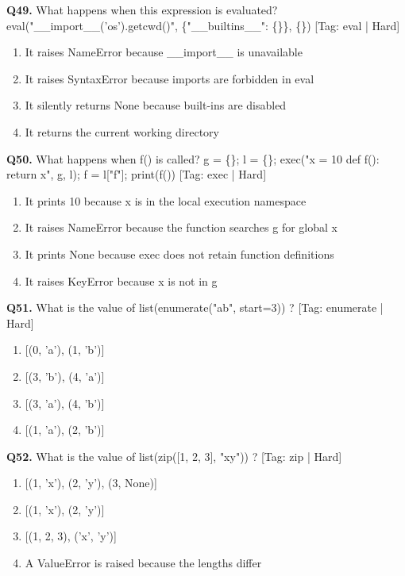 \vspace{2mm}
\noindent\textbf{Q49.} What happens when this expression is evaluated? eval("\_\_import\_\_('os').getcwd()", \{"\_\_builtins\_\_": \{\}\}, \{\}) \hfill [Tag: eval | Hard]
\begin{enumerate}[label=(\alph*),topsep=2pt,itemsep=1pt,partopsep=0pt,parsep=0pt]
    \item {It raises NameError because \_\_import\_\_ is unavailable}
    \item {It raises SyntaxError because imports are forbidden in eval}
    \item {It silently returns None because built-ins are disabled}
    \item {It returns the current working directory}
\end{enumerate}
\vspace{2mm}
\noindent\textbf{Q50.} What happens when f() is called? g = \{\}; l = \{\}; exec("x = 10 def f(): return x", g, l); f = l["f"]; print(f()) \hfill [Tag: exec | Hard]
\begin{enumerate}[label=(\alph*),topsep=2pt,itemsep=1pt,partopsep=0pt,parsep=0pt]
    \item {It prints 10 because x is in the local execution namespace}
    \item {It raises NameError because the function searches g for global x}
    \item {It prints None because exec does not retain function definitions}
    \item {It raises KeyError because x is not in g}
\end{enumerate}
\vspace{2mm}
\noindent\textbf{Q51.} What is the value of list(enumerate("ab", start=3)) ? \hfill [Tag: enumerate | Hard]
\begin{enumerate}[label=(\alph*),topsep=2pt,itemsep=1pt,partopsep=0pt,parsep=0pt]
    \item {[(0, 'a'), (1, 'b')]}
    \item {[(3, 'b'), (4, 'a')]}
    \item {[(3, 'a'), (4, 'b')]}
    \item {[(1, 'a'), (2, 'b')]}
\end{enumerate}
\vspace{2mm}
\noindent\textbf{Q52.} What is the value of list(zip([1, 2, 3], "xy")) ? \hfill [Tag: zip | Hard]
\begin{enumerate}[label=(\alph*),topsep=2pt,itemsep=1pt,partopsep=0pt,parsep=0pt]
    \item {[(1, 'x'), (2, 'y'), (3, None)]}
    \item {[(1, 'x'), (2, 'y')]}
    \item {[(1, 2, 3), ('x', 'y')]}
    \item {A ValueError is raised because the lengths differ}
\end{enumerate}
